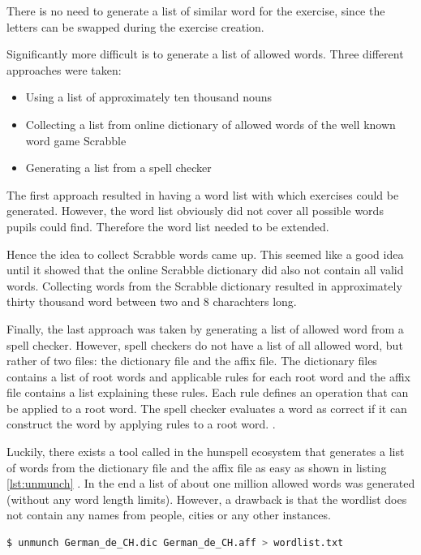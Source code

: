 There is no need to generate a list of similar word for the  exercise, since the letters can be swapped during the exercise creation.

Significantly more difficult is to generate a list of allowed words. Three different approaches were taken:

\begin{itemize}
  \item Using a list of approximately ten thousand nouns
  \item Collecting a list from online dictionary of allowed words of the well known word game Scrabble \cite{Scrabble}
  \item Generating a list from a spell checker
\end{itemize}

The first approach resulted in having a word list with which exercises could be generated. However, the word list obviously did not cover all possible words pupils could find. Therefore the word list needed to be extended.

Hence the idea to collect Scrabble words came up. This seemed like a good idea until it showed that the online Scrabble dictionary did also not contain all valid words.
Collecting words from the Scrabble dictionary resulted in approximately thirty thousand word between two and 8 charachters long.

Finally, the last approach was taken by generating a list of allowed word from a spell checker. However, spell checkers do not have a list of all allowed word, but rather of two files: the dictionary file and the affix file. The dictionary files contains a list of root words and applicable rules for each root word and the affix file contains a list explaining these rules. Each rule defines an operation that can be applied to a root word. The spell checker evaluates a word as correct if it can construct the word by applying rules to a root word. \cite{Hunspell}.

Luckily, there exists a tool called  in the hunspell ecosystem that generates a list of words from the dictionary file and the affix file as easy as shown in listing \ref{lst:unmunch} \cite{HunspellGithub}.
In the end a list of about one million allowed words was generated (without any word length limits). However, a drawback is that the wordlist does not contain any names from people, cities or any other instances. 

\begin{lstlisting}[language=Bash,caption={Bash command to unmunch a dictionary file and a affix file to a list of words},label={lst:unmunch}]
$ unmunch German_de_CH.dic German_de_CH.aff > wordlist.txt
\end{lstlisting}

